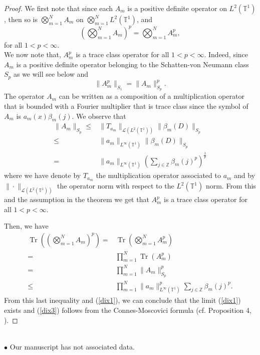 \documentclass[a4paper,12pt,reqno]{amsart}
\renewcommand\eqref[1]{(\ref{#1})} %
\theoremstyle{definition}
\theoremstyle{remark}
\numberwithin{equation}{section}
\newcommand{\zet}{\mathbb{Z}}
\newcommand{\T}{\mathbb{T}^1}
\DeclareMathOperator{\Tr}{Tr}
\def\T{{{\mathbb T}^1}}
\begin{document}
\begin{proof} We first note that since each $A_m$ is a positive definite operator on $L^{2}(\T)$, then so is 
$\bigotimes_{m=1}^N A_m$ on $\bigotimes_{m=1}^N L^{2}(\T)$, and 
\[\left(\bigotimes_{m=1}^N A_m\right)^p=\bigotimes_{m=1}^N A_m^p,\]
for all $1<p<\infty$. \\

We now note that, $A_m^p$ is a trace class operator for all $1<p<\infty$. Indeed, since $A_m$ is a positive definite operator belonging to the Schatten-von Neumann class $S_p$ as we will see below and 
\[\|A_m^p\|_{S_1}=\|A_m\|_{S_p}^{p}. \]
The operator $A_m$ can be written as a composition of a multiplication operator that is bounded with a Fourier multiplier that is trace class since the symbol of $A_m$ is   $a_m(x)\beta_m(j)$. We observe that
\begin{eqnarray*}
\|A_m\|_{S_p}\leq &\|T_{a_m}\|_{\mathcal{L}(L^2(\T))}\|\beta_m(D)\|_{S_p}\\
 \leq& \|a_m\|_{L^{\infty}(\T)}\|\beta_m(D)\|_{S_p}\\
 =&  \|a_m\|_{L^{\infty}(\T)}\left(\sum\limits_{j\in\zet}\beta_m(j)^p\right)^{\frac{1}{p}}
\end{eqnarray*}
where we have denote by $T_{a_m}$ the multiplication operator associated to $a_m$ and  by $\|\cdot\|_{\mathcal{L}(L^2(\T))}$ the operator norm with respect to the $L^2(\T)$ norm. From this and the assumption in the theorem we get that  $A_m^p$ is a trace class operator for all $1<p<\infty$. 


Then, we have 
\begin{eqnarray*} \Tr\left(\left(\bigotimes_{m=1}^N A_m\right)^p\right)=&\Tr\left(\bigotimes_{m=1}^N A_m^p\right)\\ 
    =& \prod\limits_{m=1}^{N}\Tr(A_m^p)\\
    =& \prod\limits_{m=1}^{N}\|A_m\|_{S_p}^{p}\\
    \leq &  \prod\limits_{m=1}^{N} \|a_m\|_{L^{\infty}(\T)}^p\sum\limits_{j\in\zet}\beta_m(j)^p.
\end{eqnarray*}
From this last inequality and \eqref{dix1}, we can conclude  that the limit  \eqref{dix1} exists and 
\eqref{dix3} follows from  the Connes-Moscovici formula (cf. Proposition 4, \cite{Connes}).
\end{proof}


\\


\noindent $\bullet$ Our manuscript has not associated data.\\
\end{document}

